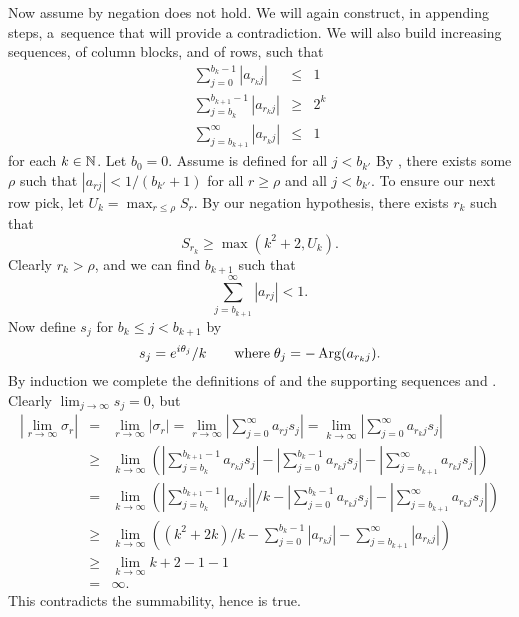 \begin{enumerate}
Now assume by negation  does not hold.
We will again construct, in appending steps, 
a~sequence  that will provide a contradiction.
We will also build increasing sequences, 
 of column blocks, and  of rows, such that
\begin{eqnarray}
\sum_{j=0}^{b_k-1} |a_{r_k j}| &\leq& 1 \label{eq:ex5.15:head} \\
\sum_{j=b_k}^{b_{k+1}-1} |a_{r_k j}| &\geq& 2^k \label{eq:ex5.15:mid} \\
\sum_{j=b_{k+1}}^\infty |a_{r_k j}| &\leq& 1 \label{eq:ex5.15:tail}
\end{eqnarray}
for each \(k\in\mathbb{N}\).
Let \(b_0=0\). 
Assume  is defined for all \(j<b_{k'}\)
By , there exists some \(\rho\) such that 
\(|a_{rj}| < 1/(b_{k'}+1)\)
for all \(r\geq \rho\) and all \(j<b_{k'}\).
To ensure our next row pick, let \(U_k = \max_{r\leq\rho}S_r\).
By our negation hypothesis, there exists \(r_k\) such that 
\[S_{r_k} \geq \max(k^2+2,U_k).\] 
Clearly \(r_k>\rho\), and we can find \(b_{k+1}\) such that 
\[\sum_{j=b_{k+1}}^\infty |a_{rj}| < 1.\]
Now define \(s_j\) for \(b_k \leq j < b_{k+1}\) by
\[s_j = e^{i\theta_j}/k \qquad  \textrm{where}\; \theta_j = -\mathop{\rm Arg}\nolimits(a_{r_k j}).\]
By induction we complete the definitions of  and 
the supporting sequences  and .
Clearly \(\lim_{j\to\infty}s_j = 0\), but
\begin{eqnarray*}
|\lim_{r\to\infty}\sigma_r|
&=& \lim_{r\to\infty} |\sigma_r| 
= \lim_{r\to\infty} \left| \sum_{j=0}^\infty a_{rj}s_j \right| 
= \lim_{k\to\infty} \left| \sum_{j=0}^\infty a_{r_k j}s_j \right| \\
&\geq& \lim_{k\to\infty} 
       \left(
          \left| \sum_{j=b_k}^{b_{k+1}-1} a_{r_k j}s_j \right| 
         - \left| \sum_{j=0}^{b_k-1} a_{r_k j}s_j \right| 
         - \left| \sum_{j=b_{k+1}}^\infty a_{r_k j}s_j \right|
       \right) \\
&=& \lim_{k\to\infty} 
       \left(
          \left| \sum_{j=b_k}^{b_{k+1}-1} |a_{r_k j}| \right| / k
         - \left| \sum_{j=0}^{b_k-1} a_{r_k j}s_j \right| 
         - \left| \sum_{j=b_{k+1}}^\infty a_{r_k j}s_j \right|
       \right) \\
&\geq& \lim_{k\to\infty} 
       \left(
          (k^2+2k) / k
         - \sum_{j=0}^{b_k-1} |a_{r_k j}|
         - \sum_{j=b_{k+1}}^\infty |a_{r_k j}|
       \right) \\
&\geq& \lim_{k\to\infty} k+2 - 1 - 1 \\
&=& \infty.
\end{eqnarray*}
This contradicts the summability, hence  is true.


\end{enumerate}
